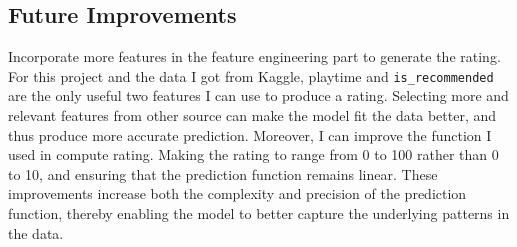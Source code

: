 \documentclass[12pt]{article}
\begin{document}
\subsection{Future Improvements}
Incorporate more features in the feature engineering part to generate the rating. For this project and the data I got from Kaggle, playtime and \texttt{is\_recommended} are the only useful two features I can use to produce a rating. Selecting more and relevant features from other source  can make the model fit the data better, and thus produce more accurate prediction. Moreover, I can  improve the function I used in compute rating. Making the rating to range from 0 to 100 rather than 0 to 10, and ensuring that  the prediction function remains linear. These improvements increase both the complexity and precision of the prediction function, thereby enabling the model to better capture the underlying patterns in the data.
\end{document}
